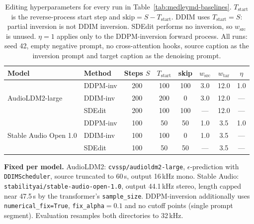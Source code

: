 \begin{table}[t]
  \centering
  \caption{Editing hyperparameters for every run in Table~\ref{tab:medleymd-baselines}.
    $T_{\text{start}}$ is the reverse-process start step and $\text{skip} = S - T_{\text{start}}$.
    DDIM uses $T_{\text{start}} = S$: partial inversion is not DDIM inversion. SDEdit performs no
    inversion, so $w_{\text{src}}$ is unused. $\eta = 1$ applies only to the DDPM-inversion
    forward process. All runs: seed 42, empty negative prompt, no cross-attention hooks,
    source caption as the inversion prompt and target caption as the denoising prompt.}
  \label{tab:medleymd-hparams}
  \begin{tabular}{llcccccc}
    \toprule
    Model & Method & Steps $S$ & $T_{\text{start}}$ & skip & $w_{\text{src}}$ & $w_{\text{tar}}$ & $\eta$ \\
    \midrule
    \multirow{3}{*}{AudioLDM2-large}
      & DDPM-inv & 200 & 100 & 100 & 3.0 & 12.0 & 1.0 \\
      & DDIM-inv & 200 & 200 & 0   & 3.0 & 12.0 & --- \\
      & SDEdit   & 200 & 100 & 100 & --- & 12.0 & --- \\
    \midrule
    \multirow{3}{*}{Stable Audio Open 1.0}
      & DDPM-inv & 100 & 50  & 50  & 1.0 & 3.5  & 1.0 \\
      & DDIM-inv & 100 & 100 & 0   & 1.0 & 3.5  & --- \\
      & SDEdit   & 100 & 50  & 50  & --- & 3.5  & --- \\
    \bottomrule
  \end{tabular}

  \vspace{0.5em}
  \parbox{\linewidth}{\footnotesize
    \textbf{Fixed per model.} AudioLDM2: \texttt{cvssp/audioldm2-large}, $\epsilon$-prediction
    with \texttt{DDIMScheduler}, source truncated to 60\,s, output 16\,kHz mono.
    Stable Audio: \texttt{stabilityai/stable-audio-open-1.0}, output 44.1\,kHz stereo, length
    capped near 47.5\,s by the transformer's \texttt{sample\_size}.
    DDPM-inversion additionally uses \texttt{numerical\_fix=True}, \texttt{fix\_alpha}$=0.1$ and
    no cutoff points (single prompt segment).
    Evaluation resamples both directories to 32\,kHz.}
\end{table}
